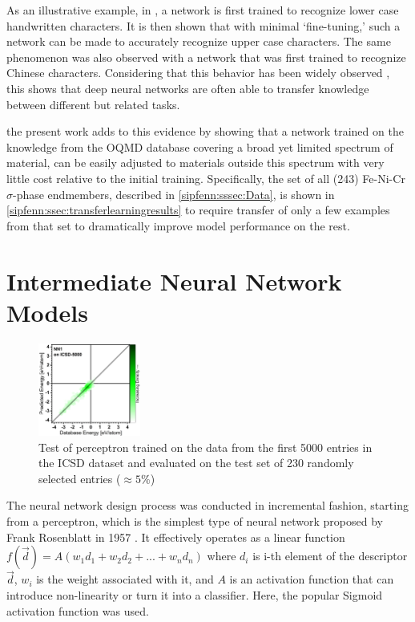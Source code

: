 As an illustrative example, in \cite{cirecsan2012transfer}, a network is first trained to recognize lower case handwritten characters. It is then shown that with minimal `fine-tuning,' such a network can be made to accurately recognize upper case characters. The same phenomenon was also observed with a network that was first trained to recognize Chinese characters. Considering that this behavior has been widely observed \cite{tan2018survey,chang2017unsupervised,george2018deep}, this shows that deep neural networks are often able to transfer knowledge between different but related tasks. 

the present work adds to this evidence by showing that a network trained on the knowledge from the OQMD database covering a broad yet limited spectrum of material, can be easily adjusted to materials outside this spectrum with very little cost relative to the initial training. Specifically, the set of all (243) Fe-Ni-Cr $\sigma$-phase endmembers, described in \ref{sipfenn:sssec:Data}, is shown in \ref{sipfenn:ssec:transferlearningresults} to require transfer of only a few examples from that set to dramatically improve model performance on the rest.

\pagebreak

\section{Intermediate Neural Network Models} \label{sipfenn:appendix2}


\begin{figure}
    \centering
    \includegraphics[width=0.3\textwidth]{sipfenn/NN1_test.png}
    \caption{Test of perceptron trained on the data from the first 5000 entries in the ICSD dataset and evaluated on the test set of 230 randomly selected entries ($\approx5\%$)}
    \vspace{-12pt}
    \label{sipfenn:fig:nn1performance}
\end{figure}

The neural network design process was conducted in incremental fashion, starting from a perceptron, which is the simplest type of neural network proposed by Frank Rosenblatt in 1957 \cite{Rosenblatt1957TheAutomaton}. It effectively operates as a linear function $f(\vec{d}) = A(w_1 d_1 + w_2 d_2 + ... + w_n d_n)$ where $d_i$ is i-th element of the descriptor $\vec{d}$, $w_i$ is the weight associated with it, and $A$ is an activation function that can introduce non-linearity or turn it into a classifier. Here, the popular Sigmoid activation function was used. 

